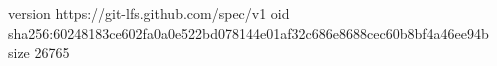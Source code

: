 version https://git-lfs.github.com/spec/v1
oid sha256:60248183ce602fa0a0e522bd078144e01af32c686e8688cec60b8bf4a46ee94b
size 26765
